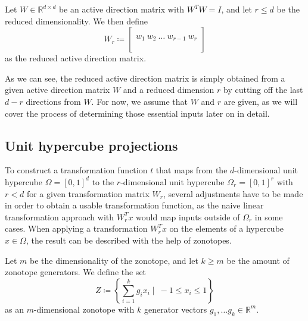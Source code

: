 \documentclass[
  a4paper,  %
  twoside,  %
  bibliography=totoc,
  headsepline,
  cleardoublepage=empty,
  parskip=half,
  draft=false
]{scrbook}
\begin{document}
\begin{definition}
Let $W \in \mathds{R}^{d \times d}$ be an active direction matrix with $W^T W=I$, and let $r \leq d$ be the reduced dimensionality.
We then define
\begin{equation}
W_r \coloneqq \begin{bmatrix}
  \\
    w_1 ~ w_2 ~ \dots ~ w_{r-1} ~ w_r\\
    \\
  \end{bmatrix}
\end{equation}
as the reduced active direction matrix.
\end{definition}
%
As we can see, the reduced active direction matrix is simply obtained from a given active direction matrix $W$ and a reduced dimension $r$ by cutting off the last $d - r$ directions from $W$.
For now, we assume that $W$ and $r$ are given, as we will cover the process of determining those essential inputs later on in detail.

\subsection{Unit hypercube projections}

To construct a transformation function $t$ that maps from the $d$-dimensional unit hypercube $\Omega=[0,1]^d$ to the $r$-dimensional unit hypercube $\Omega_r=[0,1]^r$ with $r < d$ for a given transformation matrix $W_r$, several adjustments have to be made in order to obtain a usable transformation function, as the naive linear transformation approach with $W_r^T x$ would map inputs outside of $\Omega_r$ in some cases.
When applying a transformation $W_r^T x$ on the elements of a hypercube $x \in \Omega$, the result can be described with the help of zonotopes.

\begin{definition}[Zonotope]
Let $m$ be the dimensionality of the zonotope, and let $k \geq m$ be the amount of zonotope generators.
We define the set
\begin{equation}
Z \coloneqq \left\{\sum_{i=1}^k g_i x_i \mid ~ -1 \leq x_i \leq 1\right\}
  \label{zonotope}
\end{equation}
as an $m$-dimensional zonotope with $k$ generator vectors $g_1, \dots g_k \in \mathds{R}^m$.
\end{definition}
\end{document}
